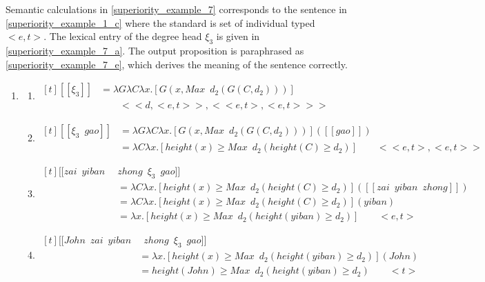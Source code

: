 \documentclass{ctexart}
\begin{document}
Semantic calculations in \ref{superiority_example_7} corresponds to the sentence in \ref{superiority_example_1_c} where the standard is set of individual typed $<e,t>$. The lexical entry of the degree head $\xi_3$ is given in \ref{superiority_example_7_a}. The output proposition is paraphrased as \ref{superiority_example_7_e}, which derives the meaning of the sentence correctly.

\begin{enumerate}
    \item \label{superiority_example_7}
    \begin{enumerate}
        \item \label{superiority_example_7_a}
        $\begin{aligned}[t]
            [\![\xi_3]\!] 
            &= \lambda G \lambda C \lambda x.[G(x,Max \enspace d_2(G(C,d_2)))] \\
            & \qquad <<d,<e,t>>,<<e,t>,<e,t>>>
        \end{aligned}$

        \item \label{superiority_example_7_b}
        $\begin{aligned}[t]
            [\![\xi_3 \enspace gao]\!] 
            &= \lambda G \lambda C \lambda x.[G(x,Max \enspace d_2(G(C,d_2)))]([\![gao]\!]) \\
            &= \lambda C \lambda x.[height(x) \geq Max \enspace d_2(height(C) \geq d_2)] \qquad <<e,t>,<e,t>>
        \end{aligned}$

        \item \label{superiority_example_7_c}
        $\begin{aligned}[t]
            [\![zai \enspace yiban \enspace & zhong \enspace \xi_3 \enspace gao]\!] \\
            &= \lambda C \lambda x.[height(x) \geq Max \enspace d_2(height(C) \geq d_2)]([\![zai \enspace yiban \enspace zhong]\!]) \\
            &= \lambda C \lambda x.[height(x) \geq Max \enspace d_2(height(C) \geq d_2)](yiban) \\
            &= \lambda x.[height(x) \geq Max \enspace d_2(height(yiban) \geq d_2)] \qquad <e,t>
        \end{aligned}$

        \item \label{superiority_example_7_d}
        $\begin{aligned}[t]
            [\![John \enspace zai \enspace yiban & \enspace zhong \enspace \xi_3 \enspace gao]\!] \\
            &= \lambda x.[height(x) \geq Max \enspace d_2(height(yiban) \geq d_2)](John) \\
            &= height(John) \geq Max \enspace d_2(height(yiban) \geq d_2) \qquad <t>
        \end{aligned}$


\end{enumerate}
\end{enumerate}
\end{document}
